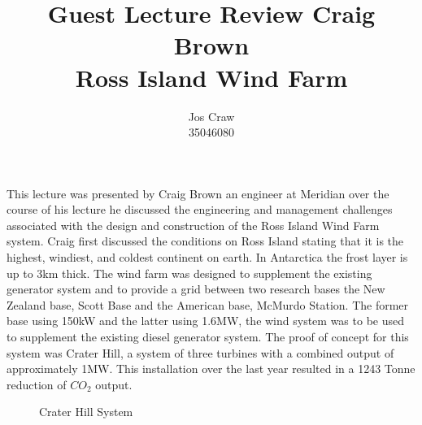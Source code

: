 \documentclass{article}
\title{Guest Lecture Review Craig Brown\\Ross Island Wind Farm}
\author{Jos Craw\\35046080}
\begin{document}
\maketitle{}

This lecture was presented by Craig Brown an engineer at Meridian over the course of his lecture
he discussed the engineering and management challenges associated with the design and construction
of the Ross Island Wind Farm system. Craig first discussed the conditions on Ross Island stating
that it is the highest, windiest, and coldest continent on earth. In Antarctica the frost layer is
up to 3km thick. The wind farm was designed to supplement the existing generator system and to
provide a grid between two research bases the New Zealand base, Scott Base and the American base,
McMurdo Station. The former base using 150kW and the latter using 1.6MW, the wind system was to be
used to supplement the existing diesel generator system. The proof of concept for this system was
Crater Hill, a system of three turbines with a combined output of approximately 1MW. This
installation over the last year resulted in a 1243 Tonne reduction of $CO_{2}$ output.

\begin{figure}[H]
    \centering
    \caption{Crater Hill System}
\end{figure}
\end{document}
